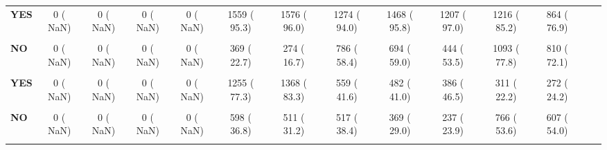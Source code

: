 \documentclass[
]{article}
\begin{document}
\begin{table}[H]
\begin{tabular}[t]{>{\raggedright\arraybackslash}p{5em}ccccccccccccc}
\textbf{YES} & 0 (  NaN) & 0 (  NaN) & 0 (  NaN) & 0 (  NaN) & 1559 ( 95.3) & 1576 ( 96.0) & 1274 ( 94.0) & 1468 ( 95.8) & 1207 ( 97.0) & 1216 ( 85.2) & 864 ( 76.9) &  & \\
\textbf{\cellcolor{gray!10}{FCLOP (\%)}} & \cellcolor{gray!10}{} & \cellcolor{gray!10}{} & \cellcolor{gray!10}{} & \cellcolor{gray!10}{} & \cellcolor{gray!10}{} & \cellcolor{gray!10}{} & \cellcolor{gray!10}{} & \cellcolor{gray!10}{} & \cellcolor{gray!10}{} & \cellcolor{gray!10}{} & \cellcolor{gray!10}{} & \cellcolor{gray!10}{NaN} & \cellcolor{gray!10}{}\\
\textbf{NO} & 0 (  NaN) & 0 (  NaN) & 0 (  NaN) & 0 (  NaN) & 369 ( 22.7) & 274 ( 16.7) & 786 ( 58.4) & 694 ( 59.0) & 444 ( 53.5) & 1093 ( 77.8) & 810 ( 72.1) &  & \\
\textbf{\cellcolor{gray!10}{Unknown}} & \cellcolor{gray!10}{0 (  NaN)} & \cellcolor{gray!10}{0 (  NaN)} & \cellcolor{gray!10}{0 (  NaN)} & \cellcolor{gray!10}{0 (  NaN)} & \cellcolor{gray!10}{0 (  0.0)} & \cellcolor{gray!10}{0 (  0.0)} & \cellcolor{gray!10}{0 (  0.0)} & \cellcolor{gray!10}{0 (  0.0)} & \cellcolor{gray!10}{0 (  0.0)} & \cellcolor{gray!10}{0 (  0.0)} & \cellcolor{gray!10}{42 (  3.7)} & \cellcolor{gray!10}{ \vphantom{2}} & \cellcolor{gray!10}{}\\
\textbf{YES} & 0 (  NaN) & 0 (  NaN) & 0 (  NaN) & 0 (  NaN) & 1255 ( 77.3) & 1368 ( 83.3) & 559 ( 41.6) & 482 ( 41.0) & 386 ( 46.5) & 311 ( 22.2) & 272 ( 24.2) &  & \\
\textbf{\cellcolor{gray!10}{FACEI (\%)}} & \cellcolor{gray!10}{} & \cellcolor{gray!10}{} & \cellcolor{gray!10}{} & \cellcolor{gray!10}{} & \cellcolor{gray!10}{} & \cellcolor{gray!10}{} & \cellcolor{gray!10}{} & \cellcolor{gray!10}{} & \cellcolor{gray!10}{} & \cellcolor{gray!10}{} & \cellcolor{gray!10}{} & \cellcolor{gray!10}{NaN} & \cellcolor{gray!10}{}\\
\textbf{NO} & 0 (  NaN) & 0 (  NaN) & 0 (  NaN) & 0 (  NaN) & 598 ( 36.8) & 511 ( 31.2) & 517 ( 38.4) & 369 ( 29.0) & 237 ( 23.9) & 766 ( 53.6) & 607 ( 54.0) &  & \\
\textbf{\cellcolor{gray!10}{Unknown}} & \cellcolor{gray!10}{0 (  NaN)} & \cellcolor{gray!10}{0 (  NaN)} & \cellcolor{gray!10}{0 (  NaN)} & \cellcolor{gray!10}{0 (  NaN)} & \cellcolor{gray!10}{0 (  0.0)} & \cellcolor{gray!10}{0 (  0.0)} & \cellcolor{gray!10}{0 (  0.0)} & \cellcolor{gray!10}{0 (  0.0)} & \cellcolor{gray!10}{0 (  0.0)} & \cellcolor{gray!10}{0 (  0.0)} & \cellcolor{gray!10}{42 (  3.7)} & \cellcolor{gray!10}{ \vphantom{1}} & \cellcolor{gray!10}{}\\

\end{tabular}
\end{table}
\end{document}
